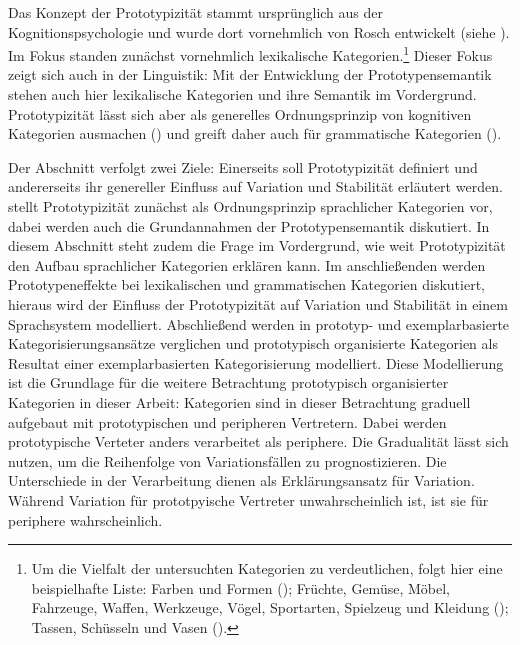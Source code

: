 Das Konzept der Prototypizität stammt ursprünglich aus der Kognitionspsychologie und wurde dort vornehmlich von Rosch entwickelt (siehe \cite{Rosch.1973, Rosch.1975, Rosch.1975b, Rosch.1975c, Rosch.1976, Rosch.1976b, Rosch.2004}). Im Fokus standen zunächst vornehmlich lexikalische Kategorien.\footnote{Um die Vielfalt der untersuchten Kategorien zu verdeutlichen, folgt hier eine beispielhafte Liste: Farben und Formen (\cite{Rosch.1973}); Früchte, Gemüse, Möbel, Fahrzeuge, Waffen, Werkzeuge, Vögel, Sportarten, Spielzeug und Kleidung (\cite{Rosch.1975b, Rosch.1975c, Rosch.1976b}); Tassen, Schüsseln und Vasen (\cite{Labov.2004}).} Dieser Fokus zeigt sich auch in der Linguistik: Mit der Entwicklung der Prototypensemantik stehen auch hier lexikalische Kategorien und ihre Semantik im Vordergrund. Prototypizität lässt sich aber als generelles Ordnungsprinzip von kognitiven Kategorien ausmachen (\cite[57--58]{Lakoff.1987}) und greift daher auch für grammatische Kategorien (\cites{Bybee.1983}[173--238]{Taylor.1995}[78--80]{Bybee.2010}).

Der Abschnitt verfolgt zwei Ziele: Einerseits soll Prototypizität definiert und andererseits ihr genereller Einfluss auf Variation und Stabilität erläutert werden.  stellt Prototypizität zunächst als Ordnungsprinzip sprachlicher Kategorien vor, dabei werden auch die Grundannahmen der Prototypensemantik diskutiert. In diesem Abschnitt steht zudem die Frage im Vordergrund, wie weit Prototypizität den Aufbau sprachlicher Kategorien erklären kann. Im anschließenden  werden Prototypeneffekte bei lexikalischen und grammatischen Kategorien diskutiert, hieraus wird der Einfluss der Prototypizität auf Variation und Stabilität in einem Sprachsystem modelliert. Abschließend werden in  prototyp- und exemplarbasierte Kategorisierungsansätze verglichen und prototypisch organisierte Kategorien als Resultat einer exemplarbasierten Kategorisierung modelliert. Diese Modellierung ist die Grundlage für die weitere Betrachtung prototypisch organisierter Kategorien in dieser Arbeit: Kategorien sind in dieser Betrachtung graduell aufgebaut mit prototypischen und peripheren Vertretern. Dabei werden prototypische Verteter anders verarbeitet als periphere. Die Gradualität lässt sich nutzen, um die Reihenfolge von Variationsfällen zu prognostizieren. Die Unterschiede in der Verarbeitung dienen als Erklärungsansatz für Variation. Während Variation für prototpyische Vertreter unwahrscheinlich ist, ist sie für periphere wahrscheinlich.


